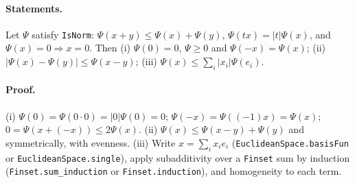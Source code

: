 \paragraph{Statements.} Let $\Psi$ satisfy \texttt{IsNorm}: $\Psi(x+y)\le\Psi(x)+\Psi(y)$,
$\Psi(tx)=|t|\Psi(x)$, and $\Psi(x)=0\Rightarrow x=0$. Then (i) $\Psi(0)=0$, $\Psi\ge0$ and
$\Psi(-x)=\Psi(x)$; (ii) $|\Psi(x)-\Psi(y)|\le\Psi(x-y)$; (iii) $\Psi(x)\le\sum_i|x_i|\Psi(e_i)$.
\paragraph{Proof.} (i) $\Psi(0)=\Psi(0\cdot0)=|0|\Psi(0)=0$; $\Psi(-x)=\Psi((-1)x)=\Psi(x)$;
$0=\Psi(x+(-x))\le2\Psi(x)$. (ii) $\Psi(x)\le\Psi(x-y)+\Psi(y)$ and symmetrically, with evenness.
(iii) Write $x=\sum_ix_ie_i$ (\texttt{EuclideanSpace.basisFun} or
\texttt{EuclideanSpace.single}), apply subadditivity over a \texttt{Finset} sum by induction
(\texttt{Finset.sum\_induction} or \texttt{Finset.induction}), and homogeneity to each term.
